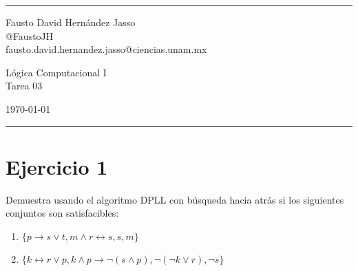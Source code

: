 \documentclass[a4paper]{article}
\begin{document}

\fancyhead[C]{}
\hrule \medskip %
\begin{minipage}{0.295\textwidth} 
\raggedright
\footnotesize
Fausto David Hernández Jasso \hfill\\   
@FaustoJH \hfill\\
fausto.david.hernandez.jasso@ciencias.unam.mx
\end{minipage}
\begin{minipage}{0.4\textwidth} 
\centering 
\large 
Lógica Computacional I\\ 
\normalsize 
Tarea 03\\ 
\end{minipage}
\begin{minipage}{0.295\textwidth} 
\raggedleft
\today\hfill\\
\end{minipage}
\medskip\hrule 
\bigskip
\section{Ejercicio 1}
Demuestra usando el algoritmo DPLL con búsqueda hacia atrás si los siguientes conjuntos son satisfacibles:
\begin{enumerate}
    \item \(\{p \rightarrow s \lor t, m \land r \leftrightarrow s, s, m\}\)
    \item \(\{k \leftrightarrow r \lor p, k \land p \rightarrow \neg \left(s \land p\right), \neg \left(\neg k \lor r\right), \neg s \}\)
\end{enumerate}
\end{document}
